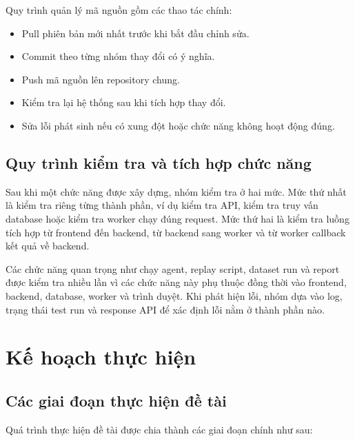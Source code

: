 Quy trình quản lý mã nguồn gồm các thao tác chính:

\begin{itemize}
    \item Pull phiên bản mới nhất trước khi bắt đầu chỉnh sửa.
    \item Commit theo từng nhóm thay đổi có ý nghĩa.
    \item Push mã nguồn lên repository chung.
    \item Kiểm tra lại hệ thống sau khi tích hợp thay đổi.
    \item Sửa lỗi phát sinh nếu có xung đột hoặc chức năng không hoạt động đúng.
\end{itemize}

\subsection{Quy trình kiểm tra và tích hợp chức năng}

Sau khi một chức năng được xây dựng, nhóm kiểm tra ở hai mức. Mức thứ nhất là kiểm tra riêng từng thành phần, ví dụ kiểm tra API, kiểm tra truy vấn database hoặc kiểm tra worker chạy đúng request. Mức thứ hai là kiểm tra luồng tích hợp từ frontend đến backend, từ backend sang worker và từ worker callback kết quả về backend.

Các chức năng quan trọng như chạy agent, replay script, dataset run và report được kiểm tra nhiều lần vì các chức năng này phụ thuộc đồng thời vào frontend, backend, database, worker và trình duyệt. Khi phát hiện lỗi, nhóm dựa vào log, trạng thái test run và response API để xác định lỗi nằm ở thành phần nào.

\section{Kế hoạch thực hiện}

\subsection{Các giai đoạn thực hiện đề tài}

Quá trình thực hiện đề tài được chia thành các giai đoạn chính như sau:

